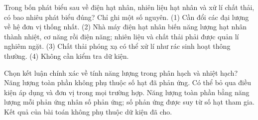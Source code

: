 \begin{ex}
Trong bốn phát biểu sau về điện hạt nhân, nhiên liệu hạt nhân và xử lí chất thải, có bao nhiêu phát biểu đúng? Chỉ ghi một số nguyên. (1) Cần đổi các đại lượng về hệ đơn vị thống nhất. (2) Nhà máy điện hạt nhân biến năng lượng hạt nhân thành nhiệt, cơ năng rồi điện năng; nhiên liệu và chất thải phải được quản lí nghiêm ngặt. (3) Chất thải phóng xạ có thể xử lí như rác sinh hoạt thông thường. (4) Không cần kiểm tra dữ kiện.
\end{ex}

\begin{ex}
Chọn kết luận chính xác về tính năng lượng trong phân hạch và nhiệt hạch?
\choice
{Năng lượng toàn phần không phụ thuộc số hạt đã phản ứng.}
{Có thể bỏ qua điều kiện áp dụng và đơn vị trong mọi trường hợp.}
{\True Năng lượng toàn phần bằng năng lượng mỗi phản ứng nhân số phản ứng; số phản ứng được suy từ số hạt tham gia.}
{Kết quả của bài toán không phụ thuộc dữ kiện đã cho.}
\end{ex}

